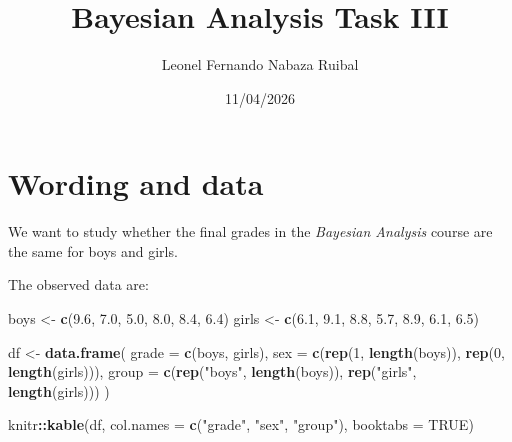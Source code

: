 \documentclass[
  english,
  12pt,
]{article}
\title{Bayesian Analysis Task III}
\author{Leonel Fernando Nabaza Ruibal}
\date{11/04/2026}
\newenvironment{Shaded}{\begin{snugshade}}{\end{snugshade}}
\newcommand{\AttributeTok}[1]{\textcolor[rgb]{0.13,0.29,0.53}{#1}}
\newcommand{\ConstantTok}[1]{\textcolor[rgb]{0.56,0.35,0.01}{#1}}
\newcommand{\DecValTok}[1]{\textcolor[rgb]{0.00,0.00,0.81}{#1}}
\newcommand{\FloatTok}[1]{\textcolor[rgb]{0.00,0.00,0.81}{#1}}
\newcommand{\FunctionTok}[1]{\textcolor[rgb]{0.13,0.29,0.53}{\textbf{#1}}}
\newcommand{\NormalTok}[1]{#1}
\newcommand{\OtherTok}[1]{\textcolor[rgb]{0.56,0.35,0.01}{#1}}
\newcommand{\SpecialCharTok}[1]{\textcolor[rgb]{0.81,0.36,0.00}{\textbf{#1}}}
\newcommand{\StringTok}[1]{\textcolor[rgb]{0.31,0.60,0.02}{#1}}
\begin{document}
\maketitle

{
\setcounter{tocdepth}{2}
\tableofcontents
}
\section{Wording and data}\label{wording-and-data}

We want to study whether the final grades in the \emph{Bayesian
Analysis} course are the same for boys and girls.

The observed data are:

\begin{Shaded}
\begin{Highlighting}[]
\NormalTok{boys  }\OtherTok{\textless{}{-}} \FunctionTok{c}\NormalTok{(}\FloatTok{9.6}\NormalTok{, }\FloatTok{7.0}\NormalTok{, }\FloatTok{5.0}\NormalTok{, }\FloatTok{8.0}\NormalTok{, }\FloatTok{8.4}\NormalTok{, }\FloatTok{6.4}\NormalTok{)}
\NormalTok{girls }\OtherTok{\textless{}{-}} \FunctionTok{c}\NormalTok{(}\FloatTok{6.1}\NormalTok{, }\FloatTok{9.1}\NormalTok{, }\FloatTok{8.8}\NormalTok{, }\FloatTok{5.7}\NormalTok{, }\FloatTok{8.9}\NormalTok{, }\FloatTok{6.1}\NormalTok{, }\FloatTok{6.5}\NormalTok{)}

\NormalTok{df }\OtherTok{\textless{}{-}} \FunctionTok{data.frame}\NormalTok{(}
  \AttributeTok{grade =} \FunctionTok{c}\NormalTok{(boys, girls),}
  \AttributeTok{sex   =} \FunctionTok{c}\NormalTok{(}\FunctionTok{rep}\NormalTok{(}\DecValTok{1}\NormalTok{, }\FunctionTok{length}\NormalTok{(boys)), }\FunctionTok{rep}\NormalTok{(}\DecValTok{0}\NormalTok{, }\FunctionTok{length}\NormalTok{(girls))),}
  \AttributeTok{group =} \FunctionTok{c}\NormalTok{(}\FunctionTok{rep}\NormalTok{(}\StringTok{"boys"}\NormalTok{, }\FunctionTok{length}\NormalTok{(boys)), }\FunctionTok{rep}\NormalTok{(}\StringTok{"girls"}\NormalTok{, }\FunctionTok{length}\NormalTok{(girls)))}
\NormalTok{)}

\NormalTok{knitr}\SpecialCharTok{::}\FunctionTok{kable}\NormalTok{(df, }\AttributeTok{col.names =} \FunctionTok{c}\NormalTok{(}\StringTok{"grade"}\NormalTok{, }\StringTok{"sex"}\NormalTok{, }\StringTok{"group"}\NormalTok{), }\AttributeTok{booktabs =} \ConstantTok{TRUE}\NormalTok{)}
\end{Highlighting}
\end{Shaded}
\end{document}

